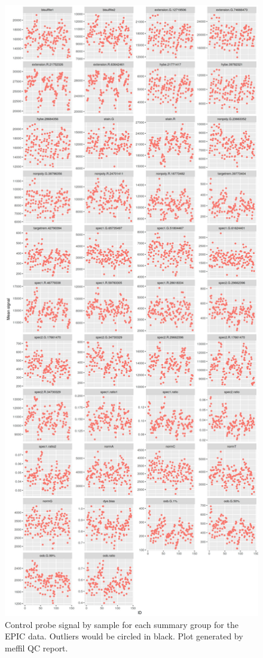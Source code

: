\documentclass[]{book}
\begin{document}
\begin{figure}

{\centering \includegraphics[width=0.8\linewidth]{figs/MAVIDOSqcEPICctrlProbes} 

}

\caption{Control probe signal by sample for each summary group for the EPIC data. Outliers would be circled in black. Plot generated by meffil QC report.}\label{fig:MAVIDOSqcEPICctrlProbes}
\end{figure}
\end{document}
